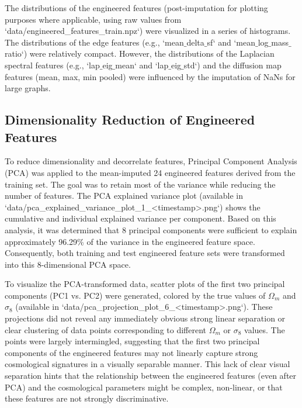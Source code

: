 \documentclass[twocolumn]{aastex631}
\begin{document}
The distributions of the engineered features (post-imputation for plotting purposes where applicable, using raw values from `data/engineered_features_train.npz`) were visualized in a series of histograms. The distributions of the edge features (e.g., `mean\ensuremath{\_}delta\ensuremath{\_}sf` and `mean\ensuremath{\_}log\ensuremath{\_}mass\ensuremath{\_}ratio`) were relatively compact. However, the distributions of the Laplacian spectral features (e.g., `lap\ensuremath{\_}eig\ensuremath{\_}mean` and `lap\ensuremath{\_}eig\ensuremath{\_}std`) and the diffusion map features (mean, max, min pooled) were influenced by the imputation of NaNs for large graphs.

\subsection{Dimensionality Reduction of Engineered Features}

To reduce dimensionality and decorrelate features, Principal Component Analysis (PCA) was applied to the mean-imputed 24 engineered features derived from the training set. The goal was to retain most of the variance while reducing the number of features. The PCA explained variance plot (available in `data/pca_explained_variance_plot_1_<timestamp>.png`) shows the cumulative and individual explained variance per component. Based on this analysis, it was determined that 8 principal components were sufficient to explain approximately 96.29\% of the variance in the engineered feature space. Consequently, both training and test engineered feature sets were transformed into this 8-dimensional PCA space.

To visualize the PCA-transformed data, scatter plots of the first two principal components (PC1 vs. PC2) were generated, colored by the true values of $\Omega_m$ and $\sigma_8$ (available in `data/pca_projection_plot_6_<timestamp>.png`). These projections did not reveal any immediately obvious strong linear separation or clear clustering of data points corresponding to different $\Omega_m$ or $\sigma_8$ values. The points were largely intermingled, suggesting that the first two principal components of the engineered features may not linearly capture strong cosmological signatures in a visually separable manner. This lack of clear visual separation hints that the relationship between the engineered features (even after PCA) and the cosmological parameters might be complex, non-linear, or that these features are not strongly discriminative.
\end{document}
